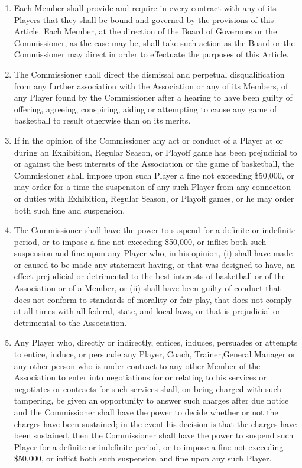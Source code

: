 \documentclass[
]{book}
\providecommand{\tightlist}{%
  \setlength{\itemsep}{0pt}\setlength{\parskip}{0pt}}
\begin{document}
\begin{enumerate}
  \begin{enumerate}
  \def\labelenumii{(\alph{enumii})}
  \tightlist
  \item
    Each Member shall provide and require in every contract with any of its Players that they shall be bound and governed by the provisions of this Article. Each Member, at the direction of the Board of Governors or the Commissioner, as the case may be, shall take such action as the Board or the Commissioner may direct in order to effectuate the purposes of this Article.
  \item
    The Commissioner shall direct the dismissal and perpetual disqualification from any further association with the Association or any of its Members, of any Player found by the Commissioner after a hearing to have been guilty of offering, agreeing, conspiring, aiding or attempting to cause any game of basketball to result otherwise than on its merits.
  \item
    If in the opinion of the Commissioner any act or conduct of a Player at or during an Exhibition, Regular Season, or Playoff game has been prejudicial to or against the best interests of the Association or the game of basketball, the Commissioner shall impose upon such Player a fine not exceeding \$50,000, or may order for a time the suspension of any such Player from any connection or duties with Exhibition, Regular Season, or Playoff games, or he may order both such fine and suspension.
  \item
    The Commissioner shall have the power to suspend for a definite or indefinite period, or to impose a fine not exceeding \$50,000, or inflict both such suspension and fine upon any Player who, in his opinion, (i) shall have made or caused to be made any statement having, or that was designed to have, an effect prejudicial or detrimental to the best interests of basketball or of the Association or of a Member, or (ii) shall have been guilty of conduct that does not conform to standards of morality or fair play, that does not comply at all times with all federal, state, and local laws, or that is prejudicial or detrimental to the Association.
  \item
    Any Player who, directly or indirectly, entices, induces, persuades or attempts to entice, induce, or persuade any Player, Coach, Trainer,General Manager or any other person who is under contract to any other Member of the Association to enter into negotiations for or relating to his services or negotiates or contracts for such services shall, on being charged with such tampering, be given an opportunity to answer such charges after due notice and the Commissioner shall have the power to decide whether or not the charges have been sustained; in the event his decision is that the charges have been sustained, then the Commissioner shall have the power to suspend such Player for a definite or indefinite period, or to impose a fine not exceeding \$50,000, or inflict both such suspension and fine upon any such Player.

\end{enumerate}
\end{enumerate}
\end{document}
